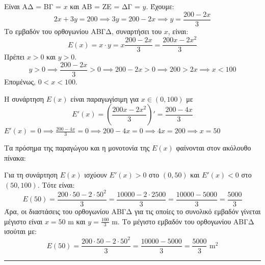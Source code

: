 \begin{alist}
\item Είναι ΑΔ = ΒΓ = $x$ και ΑΒ = ΖΕ = ΔΓ = $y$. Έχουμε:
\[ 2x + 3y = 200 \implies 3y = 200 - 2x \implies y = \frac{200 - 2x}{3} \]
Το εμβαδόν του ορθογωνίου ΑΒΓΔ, συναρτήσει του $x$, είναι:
\[ E(x) = x \cdot y = x \frac{200 - 2x}{3} = \frac{200x - 2x^2}{3} \]
Πρέπει $x > 0$ και $y > 0$.
\[ y > 0 \implies \frac{200 - 2x}{3} > 0 \implies 200 - 2x > 0 \implies 200 > 2x \implies x < 100 \]
Επομένως, $0 < x < 100$.
\item Η συνάρτηση $E(x)$ είναι παραγωγίσιμη για $x \in (0, 100)$ με
\[ E'(x) = \left( \frac{200x - 2x^2}{3} \right)' = \frac{200 - 4x}{3} \]
$E'(x) = 0 \implies \frac{200 - 4x}{3} = 0 \implies 200 - 4x = 0 \implies 4x = 200 \implies x = 50$

Τα πρόσημα της παραγώγου και η μονοτονία της $E(x)$ φαίνονται στον ακόλουθο πίνακα:
\begin{center}
\end{center}
Για τη συνάρτηση $E(x)$ ισχύουν $E'(x) > 0$ στο $(0, 50)$ και $E'(x) < 0$ στο $(50, 100)$. Τότε είναι:
\[ E(50) = \frac{200 \cdot 50 - 2 \cdot 50^2}{3} = \frac{10000 - 2 \cdot 2500}{3} = \frac{10000 - 5000}{3} = \frac{5000}{3} \]
Άρα, οι διαστάσεις του ορθογωνίου ΑΒΓΔ για τις οποίες το συνολικό εμβαδόν γίνεται μέγιστο είναι $x = 50$ m και $y = \frac{100}{3}$ m.
Το μέγιστο εμβαδόν του ορθογωνίου ΑΒΓΔ ισούται με:
\[ E(50) = \frac{200 \cdot 50 - 2 \cdot 50^2}{3} = \frac{10000 - 5000}{3} = \frac{5000}{3} \text{ m}^2 \]
\end{alist}
\vspace{6mm}
\noindent\rule{\textwidth}{0.4pt}
\vspace{6mm}

